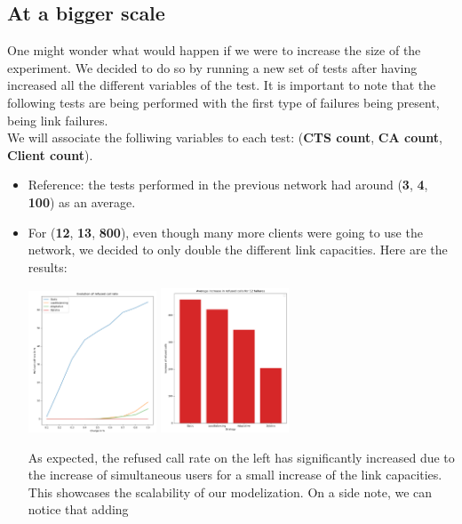 \documentclass[lettersize,journal]{IEEEtran} %
\begin{document}
\subsection{At a bigger scale}
One might wonder what would happen if we were to increase the size of the experiment. We decided to do so by running a new set of tests after
having increased all the different variables of the test.
It is important to note that the following tests are being performed with the first type of failures being present, being link failures.\\
We will associate the folliwing variables to each test: (\textbf{CTS count}, \textbf{CA count}, \textbf{Client count}).
\begin{itemize}
        \item Reference: the tests performed in the previous network had around (\textbf{3}, \textbf{4}, \textbf{100}) as an average.
        \item For (\textbf{12}, \textbf{13}, \textbf{800}), even though many more clients were going to use the network,
        we decided to only double the different link capacities. Here are the results:
        \begin{center}
                \includegraphics[width=0.3\textwidth]{images/bigger_network_1.png}
                \includegraphics[width=0.3\textwidth]{images/bigger_network_2.png}       
        \end{center}
        As expected, the refused call rate on the left has significantly increased due to the increase of simultaneous users for a small
        increase of the link capacities. This showcases the scalability of our modelization. On a side note, we can notice that adding

\end{itemize}
\end{document}
